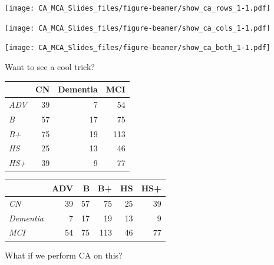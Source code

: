 \documentclass[
  ignorenonframetext,
]{beamer}
\begin{document}
\begin{frame}

\texttt{[image: CA\_MCA\_Slides\_files/figure-beamer/show\_ca\_rows\_1-1.pdf]}

\end{frame}

\begin{frame}

\texttt{[image: CA\_MCA\_Slides\_files/figure-beamer/show\_ca\_cols\_1-1.pdf]}

\end{frame}

\begin{frame}

\texttt{[image: CA\_MCA\_Slides\_files/figure-beamer/show\_ca\_both\_1-1.pdf]}

\end{frame}

\begin{frame}

Want to see a cool trick?

\end{frame}

\begin{frame}

\begin{table}[H]
\centering
\begin{tabular}{>{\em}lrrr}
\toprule
  & CN & Dementia & MCI\\
\midrule
ADV & 39 & 7 & 54\\
B & 57 & 17 & 75\\
B+ & 75 & 19 & 113\\
HS & 25 & 13 & 46\\
HS+ & 39 & 9 & 77\\
\bottomrule
\end{tabular}
\end{table}

\end{frame}

\begin{frame}

\begin{table}[H]
\centering
\begin{tabular}{>{\em}lrrrrr}
\toprule
  & ADV & B & B+ & HS & HS+\\
\midrule
CN & 39 & 57 & 75 & 25 & 39\\
Dementia & 7 & 17 & 19 & 13 & 9\\
MCI & 54 & 75 & 113 & 46 & 77\\
\bottomrule
\end{tabular}
\end{table}

What if we perform CA on this?

\end{frame}
\end{document}
